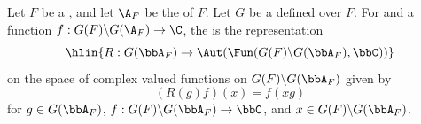 \begin{definition} \label{definition:right_regular_action_of_the_adeles_of_a_linear_algebraic_group_over_a_global_field_on_the_space_of_complex_valued_functions_on_the_adelic_quotient}
Let $F$ be a , and let $\A_F$ be the  of $F$. Let $G$ be a  defined over $F$. 
    For  and a function $f : G(F) \backslash G(\A_F) \to \C$, the  is the representation
    $$\hlin{R: G(\bbA_F) \to \Aut(\Fun(G(F) \backslash G(\bbA_F), \bbC))}$$
    on the space of complex valued functions on $G(F) \backslash G(\bbA_F)$ given by 
    $$(R(g)f)(x) = f(xg)$$
    for $g \in G(\bbA_F)$, $f: G(F) \backslash G(\bbA_F) \to \bbC$, and $x \in G(F) \backslash G(\bbA_F)$.
\end{definition}